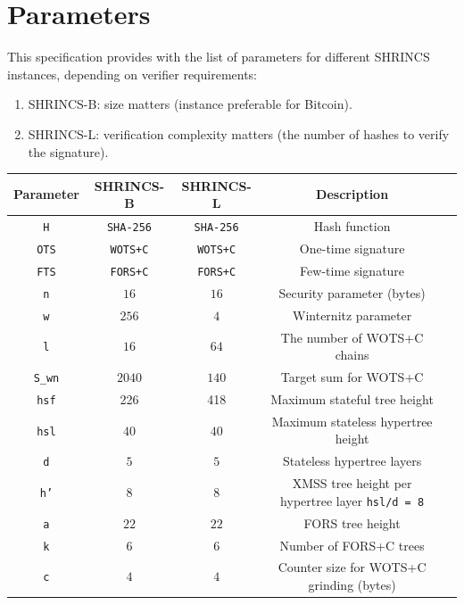 \section{Parameters}
This specification provides with the list of parameters for different SHRINCS instances, depending on verifier requirements:
\begin{enumerate}
    \item SHRINCS-B: size matters (instance preferable for Bitcoin).
    \item SHRINCS-L: verification complexity matters (the number of hashes to verify the signature).
\end{enumerate}

\begin{center}
\begin{tabular}{ c c c c c}
 Parameter & SHRINCS-B & SHRINCS-L & Description \\ 
 \hline
 \texttt{H} & \texttt{SHA-256} & \texttt{SHA-256} & Hash function \\ 
 \texttt{OTS} & \texttt{WOTS+C} & \texttt{WOTS+C} & One-time signature \\ 
 \texttt{FTS} & \texttt{FORS+C} & \texttt{FORS+C} & Few-time signature \\ 
 \texttt{n} & $16$ & $16$ & Security parameter (bytes) \\  
 \texttt{w} & $256$ & $4$ & Winternitz parameter \\
 \texttt{l}  & $16$ & $64$ & The number of WOTS+C chains \\
 \texttt{S\_wn} & $2040$ & $140$ & Target sum for WOTS+C \\
 \texttt{hsf} & 226 & 418 & Maximum stateful tree height \\
 \texttt{hsl} & $40$ & $40$ & Maximum stateless hypertree height \\
 \texttt{d} & $5$ & $5$ & Stateless hypertree layers \\
 \texttt{h'} & $8$ & $8$ & XMSS tree height per hypertree layer \texttt{hsl/d = 8} \\
 \texttt{a} & $22$ & $22$ & FORS tree height \\ 
 \texttt{k} & $6$ & $6$ & Number of FORS+C trees \\
 \texttt{c} & $4$ & $4$ & Counter size for WOTS+C grinding (bytes) \\
\end{tabular}
\end{center}

